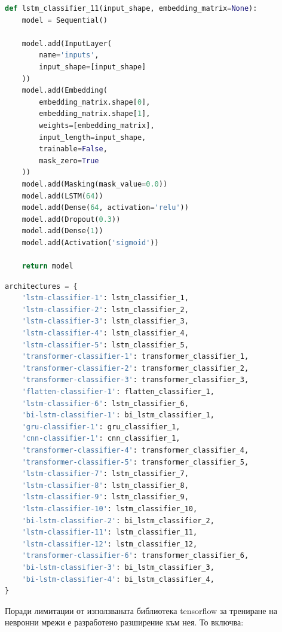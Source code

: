 \documentclass{article}
\newcounter{subsubsubsection}[subsubsection]
\begin{document}
\begin{lstlisting}[language=Python, caption=Проектиране на архитектура на модел]
def lstm_classifier_11(input_shape, embedding_matrix=None):
    model = Sequential()

    model.add(InputLayer(
        name='inputs',
        input_shape=[input_shape]
    ))
    model.add(Embedding(
        embedding_matrix.shape[0],
        embedding_matrix.shape[1],
        weights=[embedding_matrix],
        input_length=input_shape,
        trainable=False,
        mask_zero=True
    ))
    model.add(Masking(mask_value=0.0))
    model.add(LSTM(64))
    model.add(Dense(64, activation='relu'))
    model.add(Dropout(0.3))
    model.add(Dense(1))
    model.add(Activation('sigmoid'))

    return model
\end{lstlisting}

\begin{lstlisting}[language=Python, caption=Дефиниране на архитектура]
architectures = {
    'lstm-classifier-1': lstm_classifier_1,
    'lstm-classifier-2': lstm_classifier_2,
    'lstm-classifier-3': lstm_classifier_3,
    'lstm-classifier-4': lstm_classifier_4,
    'lstm-classifier-5': lstm_classifier_5,
    'transformer-classifier-1': transformer_classifier_1,
    'transformer-classifier-2': transformer_classifier_2,
    'transformer-classifier-3': transformer_classifier_3,
    'flatten-classifier-1': flatten_classifier_1,
    'lstm-classifier-6': lstm_classifier_6,
    'bi-lstm-classifier-1': bi_lstm_classifier_1,
    'gru-classifier-1': gru_classifier_1,
    'cnn-classifier-1': cnn_classifier_1,
    'transformer-classifier-4': transformer_classifier_4,
    'transformer-classifier-5': transformer_classifier_5,
    'lstm-classifier-7': lstm_classifier_7,
    'lstm-classifier-8': lstm_classifier_8,
    'lstm-classifier-9': lstm_classifier_9,
    'lstm-classifier-10': lstm_classifier_10,
    'bi-lstm-classifier-2': bi_lstm_classifier_2,
    'lstm-classifier-11': lstm_classifier_11,
    'lstm-classifier-12': lstm_classifier_12,
    'transformer-classifier-6': transformer_classifier_6,
    'bi-lstm-classifier-3': bi_lstm_classifier_3,
    'bi-lstm-classifier-4': bi_lstm_classifier_4,
}
\end{lstlisting}


Поради лимитации от използваната библиотека tensorflow за трениране на невронни мрежи е разработено разширение към нея.
То включва:
\end{document}
